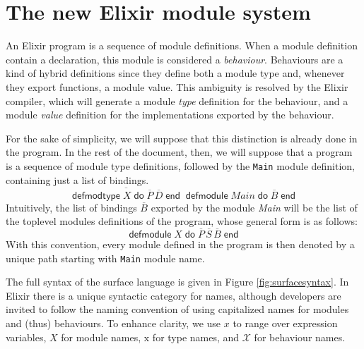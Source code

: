 \documentclass[a4paper,10pt]{article}
\DeclareMathOperator{\kwdefmt}{\textsf{defmodtype}}
\DeclareMathOperator{\kwend}{\textsf{end}}
\DeclareMathOperator{\kwdo}{\textsf{do}}
\DeclareMathOperator{\kwdefm}{\textsf{defmodule}}
\newcommand{\tx}{\textrm{x}}
\newcommand{\BX}{\ensuremath{\mathcal{X}}}
\begin{document}
\section{The new Elixir module system}
An Elixir program is a sequence of module definitions. When a module definition contain a  declaration, this module is considered a \emph{behaviour}. Behaviours are a kind of hybrid definitions since they define both a module type and, whenever they export functions, a module value. This ambiguity is resolved by the Elixir compiler, which will generate a module \emph{type} definition for the behaviour, and a module \emph{value} definition for the implementations exported by the behaviour.

For the sake of simplicity, we will suppose that this distinction is already done in the program. In the rest of the document, then, we will suppose that a program is a sequence of module type definitions, followed by the \texttt{Main} module definition, containing just a list of bindings. 
\[\overline{\kwdefmt X \kwdo \overline{P}\, \overline{D} \kwend}\kwdefm \textit{Main} \kwdo \overline{B} \kwend\]
Intuitively, the list of bindings $\overline{B}$ exported by the module \textit{Main} will be the list of the toplevel modules definitions of the program, whose general form is as follows: 
\begin{equation}\label{eq:module}
\kwdefm X \kwdo \overline{P}\, \overline{S}\, \overline{B} \kwend
\end{equation}
With this convention, every module defined in the program is then denoted by a unique path starting with \texttt{Main} module name.

The full syntax of the surface language is given in Figure \ref{fig:surfacesyntax}. In Elixir there is a unique syntactic category for names, although developers are invited to follow the naming convention of using capitalized names for modules and (thus) behaviours. To enhance clarity, we use $x$ to range over expression variables, $X$ for module names, $\tx$ for type names, and $\BX$ for behaviour names. 
\end{document}
